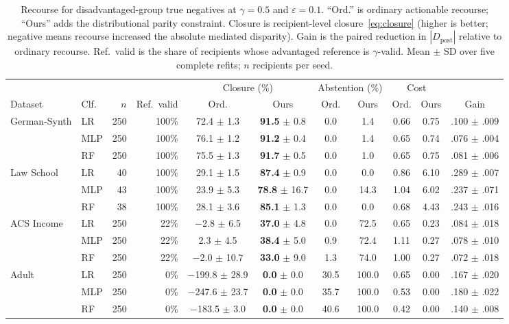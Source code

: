 \begin{table}[t]
\centering
\small
\caption{Recourse for disadvantaged-group true negatives at $\gamma=0.5$ and
$\varepsilon=0.1$. ``Ord.'' is ordinary actionable recourse; ``Ours'' adds the
distributional parity constraint. Closure is recipient-level
closure~\eqref{eq:closure} (higher is better; negative means recourse
increased the absolute mediated disparity). Gain is the paired reduction in
$|D_{\mathrm{post}}|$ relative to ordinary recourse. Ref.\ valid is the share
of recipients whose advantaged reference is $\gamma$-valid. Mean $\pm$ SD over
five complete refits; $n$ recipients per seed.}
\label{tab:main_results}
\setlength{\tabcolsep}{4pt}
\begin{tabular}{llr r cc cc cc c}
\hline
& & & &
\multicolumn{2}{c}{Closure (\%)} &
\multicolumn{2}{c}{Abstention (\%)} &
\multicolumn{2}{c}{Cost} & \\
Dataset & Clf. & $n$ & Ref.\ valid &
Ord. & Ours & Ord. & Ours & Ord. & Ours & Gain \\
\hline
German-Synth & LR  & 250 & 100\% & 72.4 $\pm$ 1.3 & \textbf{91.5} $\pm$ 0.8 & 0.0 & 1.4 & 0.66 & 0.75 & .100 $\pm$ .009 \\
             & MLP & 250 & 100\% & 76.1 $\pm$ 1.2 & \textbf{91.2} $\pm$ 0.4 & 0.0 & 1.4 & 0.65 & 0.74 & .076 $\pm$ .004 \\
             & RF  & 250 & 100\% & 75.5 $\pm$ 1.3 & \textbf{91.7} $\pm$ 0.5 & 0.0 & 1.0 & 0.65 & 0.75 & .081 $\pm$ .006 \\
\hline
Law School   & LR  & 40  & 100\% & 29.1 $\pm$ 1.5 & \textbf{87.4} $\pm$ 0.9 & 0.0 & 0.0 & 0.86 & 6.10 & .289 $\pm$ .007 \\
             & MLP & 43  & 100\% & 23.9 $\pm$ 5.3 & \textbf{78.8} $\pm$ 16.7 & 0.0 & 14.3 & 1.04 & 6.02 & .237 $\pm$ .071 \\
             & RF  & 38  & 100\% & 28.1 $\pm$ 3.6 & \textbf{85.1} $\pm$ 1.3 & 0.0 & 0.0 & 0.68 & 4.43 & .243 $\pm$ .016 \\
\hline
ACS Income   & LR  & 250 & 22\%  & $-$2.8 $\pm$ 6.5 & \textbf{37.0} $\pm$ 4.8 & 0.0 & 72.5 & 0.65 & 0.23 & .084 $\pm$ .018 \\
             & MLP & 250 & 22\%  & 2.3 $\pm$ 4.5    & \textbf{38.4} $\pm$ 5.0 & 0.9 & 72.4 & 1.11 & 0.27 & .078 $\pm$ .010 \\
             & RF  & 250 & 22\%  & $-$2.0 $\pm$ 10.7 & \textbf{33.0} $\pm$ 9.0 & 1.3 & 74.0 & 1.00 & 0.27 & .072 $\pm$ .018 \\
\hline
Adult        & LR  & 250 & 0\%   & $-$199.8 $\pm$ 28.9 & \textbf{0.0} $\pm$ 0.0 & 30.5 & 100.0 & 0.65 & 0.00 & .167 $\pm$ .020 \\
             & MLP & 250 & 0\%   & $-$247.6 $\pm$ 23.7 & \textbf{0.0} $\pm$ 0.0 & 35.7 & 100.0 & 0.53 & 0.00 & .180 $\pm$ .022 \\
             & RF  & 250 & 0\%   & $-$183.5 $\pm$ 3.0  & \textbf{0.0} $\pm$ 0.0 & 40.6 & 100.0 & 0.42 & 0.00 & .140 $\pm$ .008 \\
\hline
\end{tabular}
\end{table}


